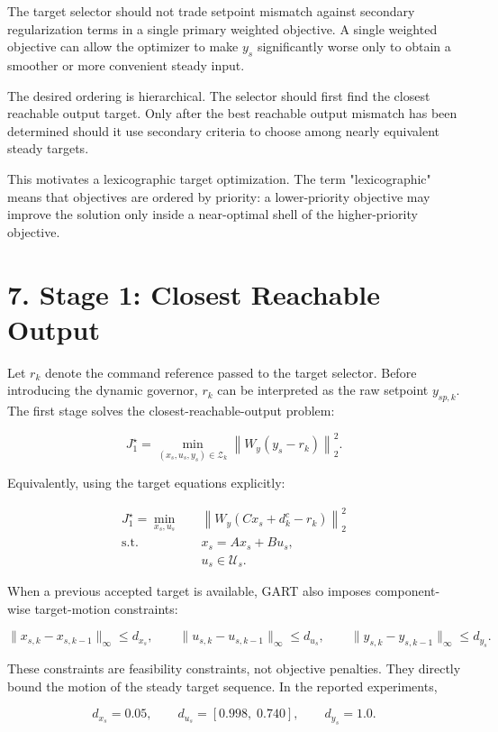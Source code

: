 \documentclass[11pt]{article}
\begin{document}
The target selector should not trade setpoint mismatch against secondary regularization terms in a single primary weighted objective. A single weighted objective can allow the optimizer to make $y_s$ significantly worse only to obtain a smoother or more convenient steady input.


The desired ordering is hierarchical. The selector should first find the closest reachable output target. Only after the best reachable output mismatch has been determined should it use secondary criteria to choose among nearly equivalent steady targets.


This motivates a lexicographic target optimization. The term "lexicographic" means that objectives are ordered by priority: a lower-priority objective may improve the solution only inside a near-optimal shell of the higher-priority objective.


\section*{7. Stage 1: Closest Reachable Output}

Let $r_k$ denote the command reference passed to the target selector. Before introducing the dynamic governor, $r_k$ can be interpreted as the raw setpoint $y_{sp,k}$. The first stage solves the closest-reachable-output problem:


\[
J_1^\star
=
\min_{(x_s,u_s,y_s)\in\mathcal Z_k}
\left\|
W_y(y_s-r_k)
\right\|_2^2 .
\]

Equivalently, using the target equations explicitly:


\[
\begin{aligned}
J_1^\star
=
\min_{x_s,u_s}
\quad&
\left\|
W_y(Cx_s+d^c_k-r_k)
\right\|_2^2 \\
\text{s.t.}\quad&
x_s=A x_s+B u_s,\\
&
u_s\in\mathcal U_s.
\end{aligned}
\]

When a previous accepted target is available, GART also imposes component-wise target-motion constraints:


\[
\|x_{s,k}-x_{s,k-1}\|_\infty \le d_{x_s},
\qquad
\|u_{s,k}-u_{s,k-1}\|_\infty \le d_{u_s},
\qquad
\|y_{s,k}-y_{s,k-1}\|_\infty \le d_{y_s}.
\]

These constraints are feasibility constraints, not objective penalties. They directly bound the motion of the steady target sequence. In the reported experiments,


\[
d_{x_s}=0.05,\qquad
d_{u_s}=[0.998,\;0.740],\qquad
d_{y_s}=1.0.
\]
\end{document}
